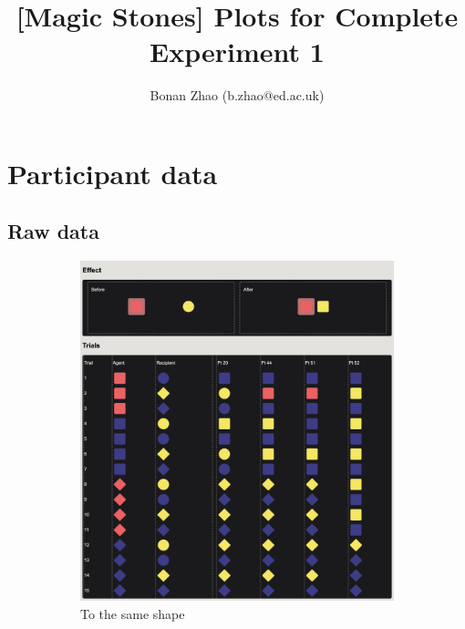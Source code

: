 \documentclass{article}
\title{[Magic Stones] Plots for Complete Experiment 1}
\author{Bonan Zhao (b.zhao@ed.ac.uk)}
\begin{document}
\maketitle

\section{Participant data}
\subsection{Raw data}

\begin{figure}[h!]
	\centering
  \begin{subfigure}[t]{0.31\textwidth}
  	\centering
  	\includegraphics[width=\linewidth]{raw_g1} 
  	\caption{To the same shape} \label{fig:raw_g1}
  \end{subfigure}
  \hfill
  \begin{subfigure}[t]{0.31\textwidth}
  	\centering

\end{subfigure}
\end{figure}
\end{document}
